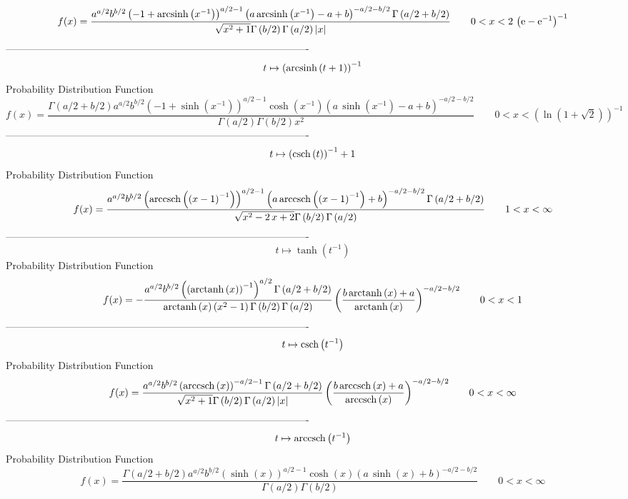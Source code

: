 \documentclass[12pt]{article}
\begin{document}
$$  f(x)={\frac {{a}^{a/2}{b}^{b/2} \left( -1+{\rm arcsinh} \left({x}^{-1}
\right) \right) ^{a/2-1} \left( a\,{\rm arcsinh} \left({x}^{-1}\right)
-a+b \right) ^{-a/2-b/2}\Gamma \left( a/2+b/2 \right) }{\sqrt {{x}^{2}
+1}\Gamma \left( b/2 \right) \Gamma \left( a/2 \right)  \left| x
 \right| }}
 \qquad0
 < x < 2\, \left( {\rm e}-{{\rm e}^{-1}} \right) ^{-1}
$$-------------------------------------------------------------------------------------------  \\$$t\mapsto  \left( {\rm arcsinh} \left(t+1\right) \right) ^{-1}
$$Probability Distribution Function 
$$  f(x)={\frac {\Gamma \left( a/2+b/2 \right) {a}^{a/2}{b}^{b/2} \left( -1+
\sinh \left( {x}^{-1} \right)  \right) ^{a/2-1}\cosh \left( {x}^{-1}
 \right)  \left( a\,\sinh \left( {x}^{-1} \right) -a+b \right) ^{-a/2-
b/2}}{\Gamma \left( a/2 \right) \Gamma \left( b/2 \right) {x}^{2}}}
 \qquad0
 < x <  \left( \ln  \left( 1+\sqrt {2} \right)  \right) ^{-1}
$$-------------------------------------------------------------------------------------------  \\$$t\mapsto  \left( {\rm csch} \left(t\right) \right) ^{-1}+1
$$Probability Distribution Function 
$$  f(x)={\frac {{a}^{a/2}{b}^{b/2} \left( {\rm arccsch} \left( \left( x-1
 \right) ^{-1}\right) \right) ^{a/2-1} \left( a\,{\rm arccsch} \left(
 \left( x-1 \right) ^{-1}\right)+b \right) ^{-a/2-b/2}\Gamma \left( a/
2+b/2 \right) }{\sqrt {{x}^{2}-2\,x+2}\Gamma \left( b/2 \right) \Gamma
 \left( a/2 \right) }}
 \qquad1
 < x < \infty 
$$-------------------------------------------------------------------------------------------  \\$$t\mapsto \tanh \left( {t}^{-1} \right) 
$$Probability Distribution Function 
$$  f(x)=-{\frac {{a}^{a/2}{b}^{b/2} \left(  \left( {\rm arctanh} \left(x
\right) \right) ^{-1} \right) ^{a/2}\Gamma \left( a/2+b/2 \right) }{
{\rm arctanh} \left(x\right) \left( {x}^{2}-1 \right) \Gamma \left( b/
2 \right) \Gamma \left( a/2 \right) } \left( {\frac {b\,{\rm arctanh} 
\left(x\right)+a}{{\rm arctanh} \left(x\right)}} \right) ^{-a/2-b/2}}
 \qquad0
 < x < 1
$$-------------------------------------------------------------------------------------------  \\$$t\mapsto {\rm csch} \left({t}^{-1}\right)
$$Probability Distribution Function 
$$  f(x)={\frac {{a}^{a/2}{b}^{b/2} \left( {\rm arccsch} \left(x\right)
 \right) ^{-a/2-1}\Gamma \left( a/2+b/2 \right) }{\sqrt {{x}^{2}+1}
\Gamma \left( b/2 \right) \Gamma \left( a/2 \right)  \left| x \right| 
} \left( {\frac {b\,{\rm arccsch} \left(x\right)+a}{{\rm arccsch} 
\left(x\right)}} \right) ^{-a/2-b/2}}
 \qquad0
 < x < \infty 
$$-------------------------------------------------------------------------------------------  \\$$t\mapsto {\rm arccsch} \left({t}^{-1}\right)
$$Probability Distribution Function 
$$  f(x)={\frac {\Gamma \left( a/2+b/2 \right) {a}^{a/2}{b}^{b/2} \left( \sinh
 \left( x \right)  \right) ^{a/2-1}\cosh \left( x \right)  \left( a\,
\sinh \left( x \right) +b \right) ^{-a/2-b/2}}{\Gamma \left( a/2
 \right) \Gamma \left( b/2 \right) }}
 \qquad0
 < x < \infty 
$$
\end{document}
